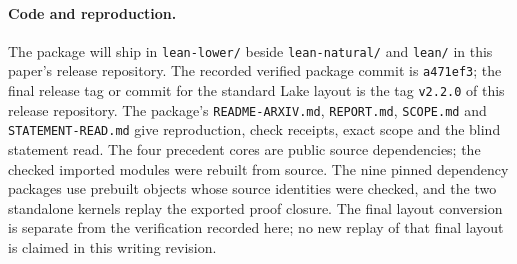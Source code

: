 \paragraph{Code and reproduction.} The package will ship in \texttt{lean-lower/} beside \texttt{lean-natural/} and \texttt{lean/} in this paper's release repository. The recorded verified package commit is \texttt{a471ef3}; the final release tag or commit for the standard Lake layout is the tag \texttt{v2.2.0} of this release repository. The package's \texttt{README-ARXIV.md}, \texttt{REPORT.md}, \texttt{SCOPE.md} and \texttt{STATEMENT-READ.md} give reproduction, check receipts, exact scope and the blind statement read. The four precedent cores are public source dependencies; the checked imported modules were rebuilt from source. The nine pinned dependency packages use prebuilt objects whose source identities were checked, and the two standalone kernels replay the exported proof closure. The final layout conversion is separate from the verification recorded here; no new replay of that final layout is claimed in this writing revision.

